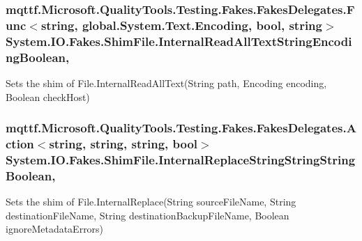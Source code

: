 \hypertarget{class_system_1_1_i_o_1_1_fakes_1_1_shim_file_a0e6f7a0669e0ddd86d86eb915f4d8de1}{
\subsubsection[{Internal\-Read\-All\-Text\-String\-Encoding\-Boolean}]{\setlength{\rightskip}{0pt plus 5cm}mqttf.\-Microsoft.\-Quality\-Tools.\-Testing.\-Fakes.\-Fakes\-Delegates.\-Func$<$string, global.\-System.\-Text.\-Encoding, bool, string$>$ System.\-I\-O.\-Fakes.\-Shim\-File.\-Internal\-Read\-All\-Text\-String\-Encoding\-Boolean\hspace{0.3cm}{\ttfamily [static]}, {\ttfamily [set]}}}\label{class_system_1_1_i_o_1_1_fakes_1_1_shim_file_a0e6f7a0669e0ddd86d86eb915f4d8de1}


Sets the shim of File.\-Internal\-Read\-All\-Text(\-String path, Encoding encoding, Boolean check\-Host)

\hypertarget{class_system_1_1_i_o_1_1_fakes_1_1_shim_file_a0595ad9f77523e1f54758981afabb8ca}{
\subsubsection[{Internal\-Replace\-String\-String\-String\-Boolean}]{\setlength{\rightskip}{0pt plus 5cm}mqttf.\-Microsoft.\-Quality\-Tools.\-Testing.\-Fakes.\-Fakes\-Delegates.\-Action$<$string, string, string, bool$>$ System.\-I\-O.\-Fakes.\-Shim\-File.\-Internal\-Replace\-String\-String\-String\-Boolean\hspace{0.3cm}{\ttfamily [static]}, {\ttfamily [set]}}}\label{class_system_1_1_i_o_1_1_fakes_1_1_shim_file_a0595ad9f77523e1f54758981afabb8ca}


Sets the shim of File.\-Internal\-Replace(\-String source\-File\-Name, String destination\-File\-Name, String destination\-Backup\-File\-Name, Boolean ignore\-Metadata\-Errors)

